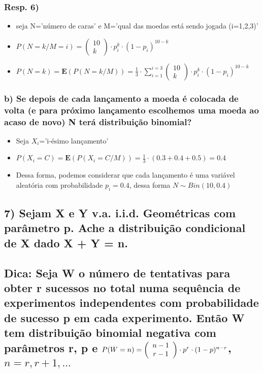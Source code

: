 \documentclass[english]{article}
\begin{document}
\subsubsection*{\textmd{Resp. 6)}}
\begin{itemize}
\item seja N='número de caras' e M='qual das moedas está sendo jogada (i=1,2,3)'
\item $P(N=k/M=i)=\left(\begin{array}{c}
10\\
k
\end{array}\right)\cdot p_{i}^{k}\cdot(1-p_{i})^{10-k}$
\item $P(N=k)=\mathbf{E}(P(N=k/M))=\frac{1}{3}\cdot\sum_{i=1}^{i=3}\left(\begin{array}{c}
10\\
k
\end{array}\right)\cdot p_{i}^{k}\cdot(1-p_{i})^{10-k}$
\end{itemize}

\subsubsection*{\textmd{b) Se depois de cada lançamento a moeda é colocada de volta
(e para próximo lançamento escolhemos uma moeda ao acaso de novo)
N terá distribuição binomial?}}
\begin{itemize}
\item Seja $X_{i}$='i-ésimo lançamento'
\item $P(X_{i}=C)=\mathbf{E}(P(X_{i}=C/M))=\frac{1}{3}\cdot(0.3+0.4+0.5)=0.4$
\item Dessa forma, podemos considerar que cada lançamento é uma variável
aleatória com probabilidade $p_{i}=0.4$, dessa forma $N\sim Bin(10,0.4)$
\end{itemize}

\subsection*{\textcompwordmark{}}


\subsection*{\textmd{7) Sejam X e Y v.a. i.i.d. Geométricas com parâmetro p. Ache
a distribuição condicional de X dado X + Y = n. }}


\subsection*{\textmd{Dica: Seja W o número de tentativas para obter r sucessos
no total numa sequência de experimentos independentes com probabilidade
de sucesso p em cada experimento. Então W tem distribuição binomial
negativa com parâmetros r, p e $P(W=n)=\left(\protect\begin{array}{c}
n-1\protect\\
r-1
\protect\end{array}\right)\cdot p^{r}\cdot(1-p)^{n-r}$, $n=r,r+1,...$}}
\end{document}
